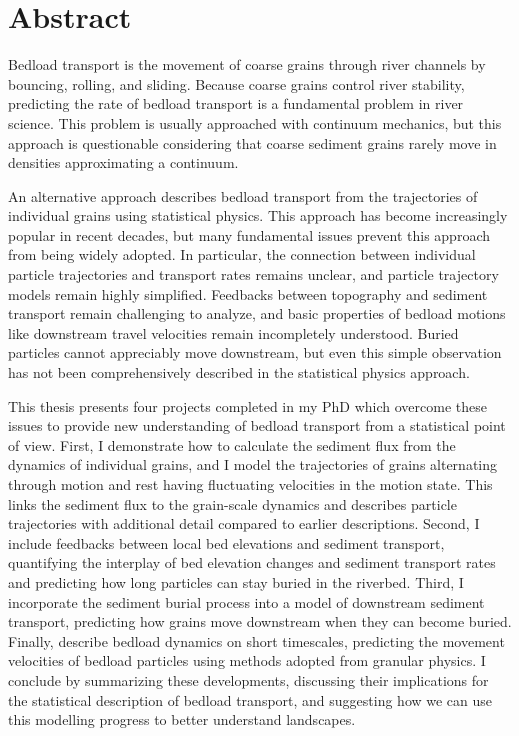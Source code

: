 
\chapter{Abstract}

Bedload transport is the movement of coarse grains through river channels by bouncing, rolling, and sliding.
Because coarse grains control river stability, predicting the rate of bedload transport is a fundamental problem in river science.
This problem is usually approached with continuum mechanics, but this approach is questionable considering that coarse sediment grains rarely move in densities approximating a continuum.

An alternative approach describes bedload transport from the trajectories of individual grains using statistical physics.
This approach has become increasingly popular in recent decades, but many fundamental issues prevent this approach from being widely adopted.
In particular, the connection between individual particle trajectories and transport rates remains unclear, and particle trajectory models remain highly simplified.
Feedbacks between topography and sediment transport remain challenging to analyze, and basic properties of bedload motions like downstream travel velocities remain incompletely understood.
Buried particles cannot appreciably move downstream, but even this simple observation has not been comprehensively described in the statistical physics approach.

This thesis presents four projects completed in my PhD which overcome these issues to provide new understanding of bedload transport from a statistical point of view.
First, I demonstrate how to calculate the sediment flux from the dynamics of individual grains, and I model the trajectories of grains alternating through motion and rest having fluctuating velocities in the motion state.
This links the sediment flux to the grain-scale dynamics and describes particle trajectories with additional detail compared to earlier descriptions.
Second, I include feedbacks between local bed elevations and sediment transport, quantifying the interplay of bed elevation changes and sediment transport rates and predicting how long particles can stay buried in the riverbed.
Third, I incorporate the sediment burial process into a model of downstream sediment transport, predicting how grains move downstream when they can become buried.
Finally, describe bedload dynamics on short timescales, predicting the movement velocities of bedload particles using methods adopted from granular physics.
I conclude by summarizing these developments, discussing their implications for the statistical description of bedload transport, and suggesting how we can use this modelling progress to better understand landscapes.



